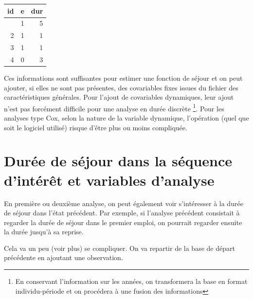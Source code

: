\documentclass[
  12pt,
  letterpaper,
  DIV=11,
  numbers=noendperiod,
  onepage,
  openany]{scrreprt}
\begin{document}
\begin{longtable}[]{@{}rrr@{}}
\toprule\noalign{}
id & e & dur \\
\midrule\noalign{}
\endhead
\bottomrule\noalign{}
\endlastfoot
1 & 1 & 5 \\
2 & 1 & 1 \\
3 & 1 & 1 \\
4 & 0 & 3 \\
\end{longtable}

Ces informations sont suffisantes pour estimer une fonction de séjour et
on peut ajouter, si elles ne sont pas présentes, des covariables fixes
issues du fichier des caractéristiques générales. Pour l'ajout de
covariables dynamiques, leur ajout n'est pas forcément difficile pour
une analyse en durée discrète \footnote{En conservant l'information sur
  les années, on transformera la base en format individu-période et on
  procédera à une fusion des informations}. Pour les analyses type Cox,
selon la nature de la variable dynamique, l'opération (quel que soit le
logiciel utilisé) risque d'être plus ou moins compliquée.

\hypertarget{duruxe9e-de-suxe9jour-dans-la-suxe9quence-dintuxe9ruxeat-et-variables-danalyse}{%
\section{Durée de séjour dans la séquence d'intérêt et variables
d'analyse}\label{duruxe9e-de-suxe9jour-dans-la-suxe9quence-dintuxe9ruxeat-et-variables-danalyse}}

En première ou deuxième analyse, on peut également voir s'intéresser à
la durée de séjour dans l'état précédent. Par exemple, si l'analyse
précédent consistait à regarder la durée de séjour dans le premier
emploi, on pourrait regarder ensuite la durée jusqu'à sa reprise.

Cela va un peu (voir plus) se compliquer. On va repartir de la base de
départ précédente en ajoutant une observation.
\end{document}

